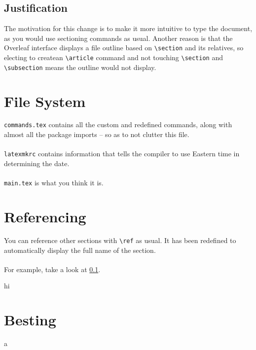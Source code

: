\documentclass{constitution}
\begin{document}
\subsection{Justification}
\label{justification}
The motivation for this change is to make it more intuitive to type the document, as you would use sectioning commands as usual.
Another reason is that the Overleaf interface displays a file outline based on \verb|\section| and its relatives, so electing to createan \verb|\article| command and not touching \verb|\section| and \verb|\subsection| means the outline would not display.

\section{File System}
\verb|commands.tex| contains all the custom and redefined commands, along with almost all the package imports -- so as to not clutter this file.
\\\\
\verb|latexmkrc| contains information that tells the compiler to use Eastern time in determining the date.
\\\\
\verb|main.tex| is what you think it is.

\section{Referencing}
You can reference other sections with \verb|\ref| as usual.
It has been redefined to automatically display the full name of the section.
\\\\
For example, take a look at \ref{justification}.




hi
\section{Besting}
a
\end{document}
